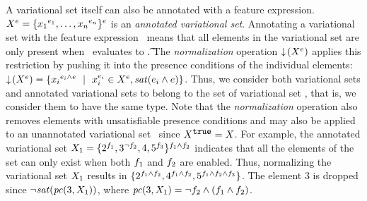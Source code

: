 A variational set itself can also be annotated with a feature expression.
%
$\annot \vset = \setDef {\annot [\dimMeta_1] {\elem_1},\ldots,\annot [\dimMeta_n] {\elem_n}}^\dimMeta$ is an
\emph{annotated variational set}.
Annotating a variational set with the feature expression \dimMeta\ means that all
elements in the variational set are only present when \dimMeta\ evaluates to \t.
The \emph{normalization} operation $\pushIn {\annot \vset}$ applies this
restriction by pushing it into the presence conditions of the individual
elements:
\ensuremath{
\pushIn {\annot \vset}
= 
\setDef{\annot [\dimMeta_i \wedge \dimMeta] {\elem_i} \myOR 
\annot [\dimMeta_i] \elem_i \in \annot \vset, \sat {\dimMeta_i \wedge \dimMeta}
}}.
Thus, we consider both variational sets and annotated variational sets to 
belong to the set of variational set \vsetSet, that is, we consider them to have the same type. 
Note that the \emph{normalization} operation also removes elements
with unsatisfiable presence conditions and may also be applied
to an unannotated variational set \vset\ since $\annot[\t]{\vset} = \vset$.
%
For example, the annotated variational set
$\vset_1 = \{\annot [\A] 2, \annot [\neg \B] 3, 4, \annot [\C] 5\}^{\A \wedge \B}$
indicates that all the elements of the set can only exist
when both $\A$ and $\B$ are enabled. Thus, normalizing the variational set $\vset_1$
results in
$\{\annot [\A \wedge \B] 2,\annot [\A \wedge \B] 4,\annot [\A \wedge \B \wedge \C] 5\}$. The element $3$ is dropped 
since 
\ensuremath{\neg \sat {\getPCfrom 3 {\vset_1} }},
where
\ensuremath{
{\getPCfrom 3 {\vset_1} } = \neg \B \wedge (\A \wedge \B)}.
